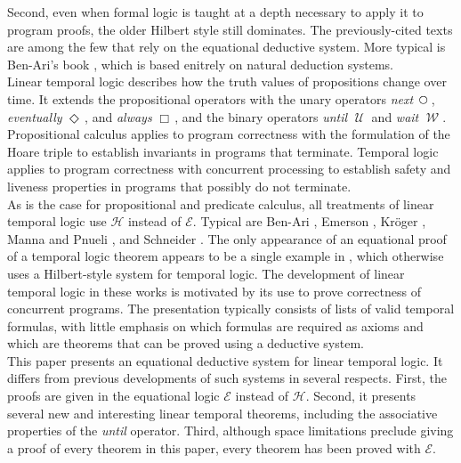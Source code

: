 \documentclass[fleqn, leqno]{article}
\newcommand{\Until}{\;\mathcal{U}\;}
\newcommand{\Wait}{\;\mathcal{W}\;}
\newcommand{\Next}{\;\,\text{\raisebox{3.5pt}{\circle{6}}}}
\newcommand{\Event}{\Diamond\,}
\newcommand{\Always}{\Box\,}
\begin{document}
Second, even when formal logic is taught at a depth necessary to apply it to program proofs, the older Hilbert style
still dominates.
The previously-cited texts \cite{Cohen, LADM, Kald} are among the few that rely on the equational deductive system. 
More typical is Ben-Ari's book \cite{Ben}, which is based enitrely on natural deduction systems.\\

Linear temporal logic describes how the truth values of propositions change over time.
It extends the propositional operators with the unary operators \textit{next} $\Next$, \textit{eventually} $\Event$,
and \textit{always} $\Always$,
and the binary operators \textit{until} $\Until$ and \textit{wait} $\Wait$.
Propositional calculus applies to program correctness with the formulation of the Hoare triple to establish invariants
in programs that terminate.
Temporal logic applies to program correctness with concurrent processing to establish safety and liveness properties
in programs that possibly do not terminate.\\

As is the case for propositional and predicate calculus, all treatments of linear temporal logic use $\mathcal{H}$
instead of $\mathcal{E}$. Typical are Ben-Ari \cite{Ben2}, Emerson \cite{Emer}, Kr\"{o}ger \cite{Kroger},
Manna and Pnueli \cite{Manna}, and Schneider \cite{Schn}.
The only appearance of an equational proof of a temporal logic theorem appears to be a single example in \cite{Schn},
which otherwise uses a Hilbert-style system for temporal logic.
The development of linear temporal logic in these works is motivated by its use to prove correctness of concurrent programs.
The presentation typically consists of lists of valid temporal formulas, with little emphasis on which formulas are required
as axioms and which are theorems that can be proved using a deductive system.\\

This paper presents an equational deductive system for linear temporal logic.
It differs from previous developments of such systems in several respects.
First, the proofs are given in the equational logic $\mathcal{E}$ instead of $\mathcal{H}$.
Second, it presents several new and interesting linear temporal theorems, including the associative
properties of the \textit{until} operator.
Third, although space limitations preclude giving a proof of every theorem in this paper,
every theorem has been proved with $\mathcal{E}$.\\
\end{document}
